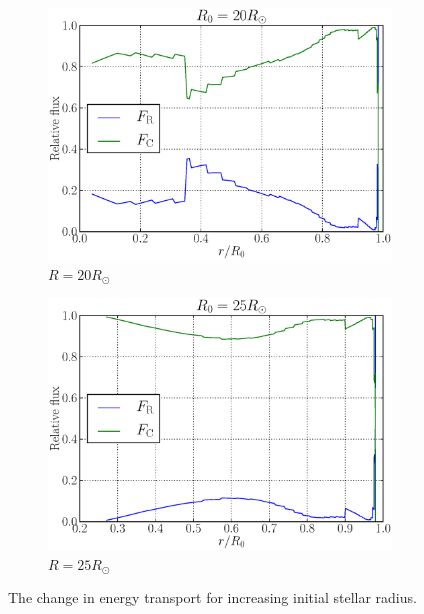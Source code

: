 \documentclass[a4paper, 11pt, english]{article}
\begin{document}
\begin{figure}[htpb]
\begin{subfigure}{0.49\textwidth}
		\includegraphics[width=\linewidth]{figures/flux_20Rsun.eps}
		\caption{$R = 20R_{\odot}$}
		\label{fig:flux_20Rsun}
	\end{subfigure}\hfill
	\begin{subfigure}{0.49\textwidth}
		\includegraphics[width=\linewidth]{figures/flux_25Rsun.eps}
		\caption{$R = 25R_{\odot}$}
		\label{fig:flux_25Rsun}
	\end{subfigure}
	\vspace{0.2cm}
	\caption{The change in energy transport for increasing initial stellar radius.}
	\label{fig:flux_change}
\end{figure}
\end{document}
